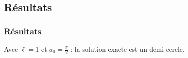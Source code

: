 \documentclass[11pt,envcountsect,aspectratio=169]{beamer} %
\begin{document}
\subsection{Résultats}

\begin{frame}
    \frametitle{Résultats}

    Avec $\ell=1$ et $a_0=\frac{\pi}{2}$ : la solution exacte est un demi-cercle.

    \begin{center}
    \def\echelle{0.3}
\end{center}
\end{frame}
\end{document}
